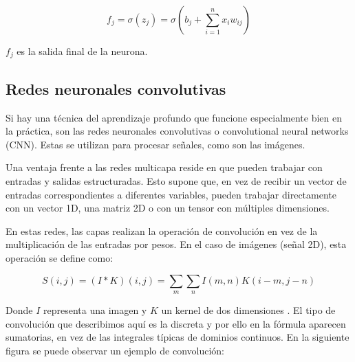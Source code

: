 \begin{equation}
    f_j = \sigma(z_j) = \sigma(b_j + \sum_{i=1}^{n} x_iw_{ij})
\end{equation}

\noindent $f_j$ es la salida final de la neurona. \cite{berzal2018redes}

\subsection{Redes neuronales convolutivas}
Si hay una técnica del aprendizaje profundo que funcione especialmente bien en la práctica, son las redes neuronales convolutivas o convolutional neural networks (CNN). Estas se utilizan para procesar señales, como son las imágenes.

Una ventaja frente a las redes multicapa reside en que pueden trabajar con entradas y salidas estructuradas. Esto supone que, en vez de recibir un vector de entradas correspondientes a diferentes variables, pueden trabajar directamente con un vector 1D, una matriz 2D o con un tensor con múltiples dimensiones. \cite{berzal2018redes} 

En estas redes, las capas realizan la operación de convolución en vez de la multiplicación de las entradas por pesos. En el caso de imágenes (señal 2D), esta operación se define como:

\begin{equation}
    S(i,j) = (I*K)(i,j) = \sum_m \sum_n I(m,n)K(i-m,j-n)
\end{equation}

Donde $I$ representa una imagen y $K$ un kernel de dos dimensiones \cite{Goodfellow-et-al-2016}. El tipo de convolución que describimos aquí es la discreta y por ello en la fórmula aparecen sumatorias, en vez de las integrales típicas de dominios continuos. En la siguiente figura se puede observar un ejemplo de convolución:


